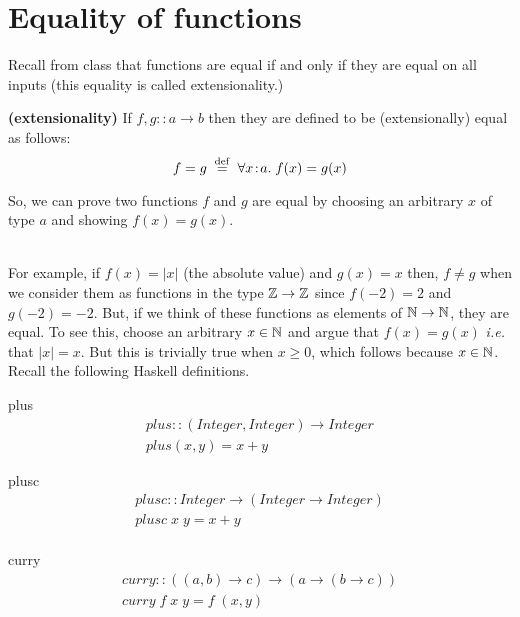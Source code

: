 \documentclass[11pt]{article}
\begin{document}

\section{Equality of functions}
Recall from class that functions are equal if and only if they are equal on all
inputs (this equality is called extensionality.)

\begin{definition}{{\bf{(extensionality)}}}
If $f,g::a\rightarrow{}b$ then they are defined to be (extensionally) equal as follows:
\[ f = g \; \;{\stackrel{\rm def}{=}}\;\; \forall{}x\!:\!a.\; f(x) = g(x) \]
\end{definition}

So, we can prove two functions $f$ and $g$ are equal by choosing an arbitrary
$x$ of type $a$ and showing $f(x) = g(x)$.

\ \\ For example, if $f(x) = |x|$ (the absolute value) and $g(x) = x$ then,
$f\not={}g$ when we consider them as functions in the type ${\mathbb{Z}} \rightarrow
{\mathbb{Z}}$ since $f(-2) = 2$ and $g(-2)=-2$.  But, if we think of these functions as
elements of ${\mathbb{N}}\rightarrow{\mathbb{N}}$, they are equal.  To see this, choose an
arbitrary $x\in{\mathbb{N}}$ and argue that $f(x) = g(x)$ {\em{i.e.}}  that $|x|=x$.
But this is trivially true when $x \ge 0$, which follows because $x\in{\mathbb{N}}$.  \
\\

Recall the following Haskell definitions.
\begin{definition}{plus}
\[\begin{array}{l}
plus :: (Integer,Integer) \rightarrow Integer \\
plus(x,y) = x + y 
\end{array}\]
\end{definition}


\begin{definition}{plusc}
\[\begin{array}{l}
plusc :: Integer \rightarrow (Integer \rightarrow Integer) \\
plusc \; x \; y = x + y \\
\end{array}\]
\end{definition}

\begin{definition}{curry}
\[\begin{array}{l}
curry :: ((a,b) \rightarrow c) \rightarrow (a \rightarrow (b \rightarrow c))\\
curry\; f\; x\; y = f\; (x,y) 
\end{array}\]
\end{definition}
\end{document}
